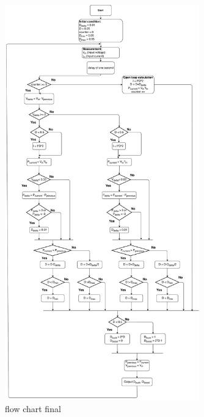 \begin{figure}[H]
	\begin{center}
		\includegraphics[width=0.75\textwidth]{../Pictures/2018_11_14_Flow_chart_MPPT_Buck-Boost_converter}
		\caption{flow chart final }
		\label{fcfinal}
	\end{center}	
\end{figure}
